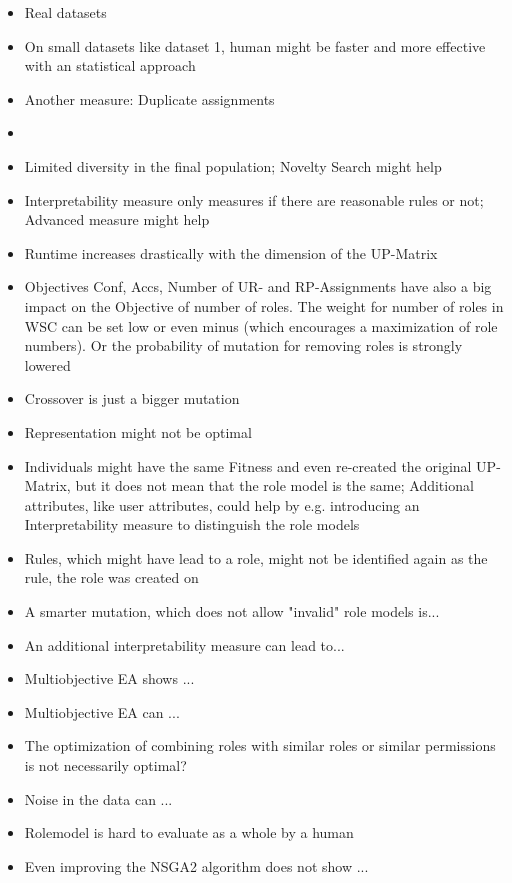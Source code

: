 \begin{itemize}
    \item Real datasets
    \item On small datasets like dataset 1, human might be faster and more effective with an statistical approach
    \item Another measure: Duplicate assignments
    \item 
    \item Limited diversity in the final population; Novelty Search might help
    \item Interpretability measure only measures if there are reasonable rules or not; Advanced measure might help
    \item Runtime increases drastically with the dimension of the UP-Matrix
    \item Objectives Conf, Accs, Number of UR- and RP-Assignments have also a big impact on the Objective of number of roles. The weight for number of roles in WSC can be set low or even minus (which encourages a maximization of role numbers). Or the probability of mutation for removing roles is strongly lowered
    \item Crossover is just a bigger mutation
    \item Representation might not be optimal
    \item Individuals might have the same Fitness and even re-created the original UP-Matrix, but it does not mean that the role model is the same; Additional attributes, like user attributes, could help by e.g. introducing an Interpretability measure to distinguish the role models
    \item Rules, which might have lead to a role, might not be identified again as the rule, the role was created on
    \item A smarter mutation, which does not allow "invalid" role models is...
    \item An additional interpretability measure can lead to...
    \item Multiobjective EA shows ...
    \item Multiobjective EA can ...
    \item The optimization of combining roles with similar roles or similar permissions is not necessarily optimal?
    \item Noise in the data can ...
    \item Rolemodel is hard to evaluate as a whole by a human
    \item Even improving the NSGA2 algorithm does not show ...

\end{itemize}
